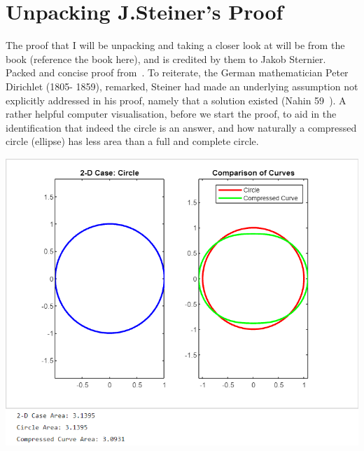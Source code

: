 \documentclass[a4paper]{book}
\numberwithin{theorem}{section}%
\begin{document}
\section{Unpacking J.Steiner's Proof}
The proof that I will be unpacking and taking a closer look at will be from the book (reference the book here), and is credited by them to Jakob Sternier. Packed and concise proof from~\citep{gluck2012isoperimetric}. To reiterate, the German mathematician Peter Dirichlet (1805- 1859), remarked, Steiner had made an underlying assumption not explicitly addressed in his proof, namely that a solution existed (Nahin 59~\citep{nahin2021least}). A rather helpful computer visualisation, before we start the proof, to aid in the identification that indeed the circle is an answer, and how naturally a compressed circle (ellipse) has less area than a full and complete circle.
\begin{minipage}{\linewidth}
    \centering
    \includegraphics[width=150mm]{steinerproofvisualisation.png}
\end{minipage}
\end{document}
